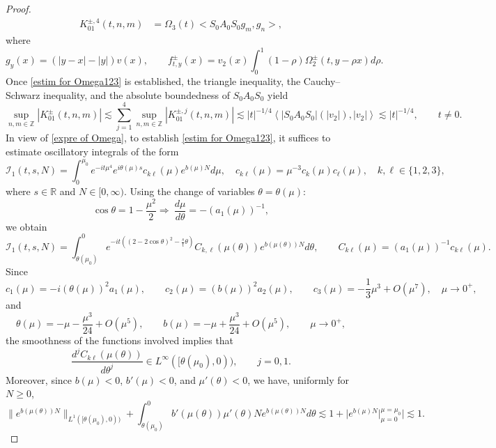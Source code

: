 \documentclass[reqno, 11pt]{amsart}
\newcommand\R{\mathbb{R}}
\newcommand\Z{\mathbb{Z}}
\newcommand\mcaI{\mathcal{I}}
\numberwithin{equation}{section}
\begin{document}
\begin{proof}
\begin{align*}
K^{\pm,4}_{01}(t,n,m)&=\Omega_3(t)\big<S_0A_0S_0g_m,g_n\big>,
\end{align*}
where
\begin{equation*}
g_y(x)=(|y-x|-|y|)v(x),\qquad    f^{\pm}_{t,y}(x)=v_2(x)\int_{0}^{1}(1-\rho)\Omega^{\pm}_2(t,y-\rho x)d\rho.
\end{equation*}
Once \eqref{estim for Omega123} is established, the triangle inequality, the Cauchy--Schwarz inequality, and the absolute boundedness of $S_0A_0S_0$ yield
\begin{equation*}
\sup\limits_{n,m\in\Z}|K^{\pm}_{01}(t,n,m)|\lesssim\sum\limits_{j=1}^{4}\sup\limits_{n,m\in\Z}|K^{\pm,j}_{01}(t,n,m)|\lesssim |t|^{-1/4}\left<|S_0A_0S_0|(|v_2|),|v_2|\right>\lesssim |t|^{-1/4},\qquad t\neq0.
\end{equation*}
In view of \eqref{expre of Omega}, to establish \eqref{estim for Omega123}, it suffices to estimate oscillatory integrals of the form
\begin{equation*} 
\mcaI_{1}(t,s,N)=\int_{0}^{\mu_0}e^{-it\mu^4}e^{i\theta(\mu)s}c_{k\ell}(\mu)e^{b(\mu)N}d\mu,\quad c_{k\ell}(\mu)=\mu^{-3}c_k(\mu)c_{\ell}(\mu),\quad k, \ell\in\{1,2,3\},
\end{equation*}
where $s\in\R$ and $N\in[0,\infty)$. Using the change of variables
$\theta=\theta(\mu)$:
\begin{equation}\label{varible substi local}
 \cos\theta=1-\frac{\mu^2}{2} \Longrightarrow\  \frac{d\mu}{d\theta}=-(a_1(\mu))^{-1},
\end{equation}
we obtain 
\begin{equation*}
\mcaI_1(t,s,N)=\int_{\theta(\mu_0)}^{0}e^{-it((2-2\cos \theta)^2-\frac{ s}{t}\theta)} C_{k,\ell}(\mu(\theta))e^{b(\mu(\theta))N}d\theta,\qquad C_{k\ell}(\mu)=(a_1(\mu))^{-1}c_{k\ell}(\mu).
\end{equation*}
Since
$$c_1(\mu)=- i(\theta(\mu))^2a_1(\mu), \qquad c_2(\mu)=(b(\mu))^2a_2(\mu),\qquad c_3(\mu)=-\frac{1}{3}\mu^3+O(\mu^7),\quad \mu\rightarrow0^+,$$
and 
\begin{equation*}
    \theta(\mu)=-\mu-\frac{\mu^3}{24}+O(\mu^5),\qquad b(\mu)=-\mu+\frac{\mu^3}{24}+O(\mu^5),\qquad\mu\rightarrow0^+,
\end{equation*}
the smoothness of the functions involved implies that
$$\frac{d^jC_{k\ell}(\mu(\theta))}{d\theta^j}\in L^{\infty}([\theta(\mu_0),0)),\qquad j=0,1.$$
Moreover, since $b(\mu)<0$, $b'(\mu)<0$, and $\mu'(\theta)<0$, we have, uniformly for $N\geq0$,
\begin{equation}\label{estim for ebutheta}
\|e^{b(\mu(\theta))N}\|_{L^1([\theta(\mu_0),0))}+\int_{\theta(\mu_0)}^{0}b'(\mu(\theta))\mu'(\theta)Ne^{b(\mu(\theta))N}d\theta\lesssim 1+\big|e^{b(\mu)N}|^{\mu=\mu_0}_{\mu=0}\big|\lesssim1.

\end{equation}
\end{proof}
\end{document}
